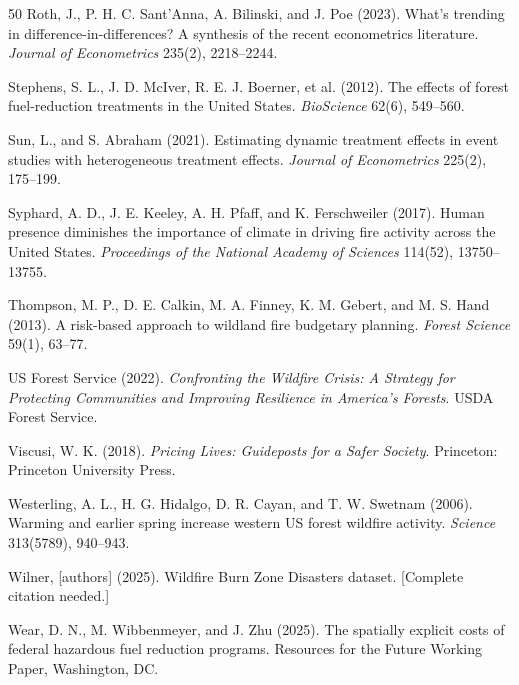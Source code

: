 \documentclass[12pt, letterpaper]{article}
\begin{document}
\begin{thebibliography}{50}
Roth, J., P. H. C. Sant'Anna, A. Bilinski, and J. Poe (2023). What's trending in difference-in-differences? A synthesis of the recent econometrics literature. \textit{Journal of Econometrics} 235(2), 2218--2244.

Stephens, S. L., J. D. McIver, R. E. J. Boerner, et al. (2012). The effects of forest fuel-reduction treatments in the United States. \textit{BioScience} 62(6), 549--560.

Sun, L., and S. Abraham (2021). Estimating dynamic treatment effects in event studies with heterogeneous treatment effects. \textit{Journal of Econometrics} 225(2), 175--199.

Syphard, A. D., J. E. Keeley, A. H. Pfaff, and K. Ferschweiler (2017). Human presence diminishes the importance of climate in driving fire activity across the United States. \textit{Proceedings of the National Academy of Sciences} 114(52), 13750--13755.

Thompson, M. P., D. E. Calkin, M. A. Finney, K. M. Gebert, and M. S. Hand (2013). A risk-based approach to wildland fire budgetary planning. \textit{Forest Science} 59(1), 63--77.

US Forest Service (2022). \textit{Confronting the Wildfire Crisis: A Strategy for Protecting Communities and Improving Resilience in America's Forests}. USDA Forest Service.

Viscusi, W. K. (2018). \textit{Pricing Lives: Guideposts for a Safer Society}. Princeton: Princeton University Press.

Westerling, A. L., H. G. Hidalgo, D. R. Cayan, and T. W. Swetnam (2006). Warming and earlier spring increase western US forest wildfire activity. \textit{Science} 313(5789), 940--943.

Wilner, [authors] (2025). Wildfire Burn Zone Disasters dataset. [Complete citation needed.]

Wear, D. N., M. Wibbenmeyer, and J. Zhu (2025). The spatially explicit costs of federal hazardous fuel reduction programs. Resources for the Future Working Paper, Washington, DC.

\end{thebibliography}
\end{document}
